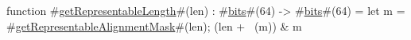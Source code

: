 function #\hyperref[sailMIPSzgetRepresentableLength]{getRepresentableLength}#(len) : #\hyperref[sailMIPSzbits]{bits}#(64) -> #\hyperref[sailMIPSzbits]{bits}#(64) = {
  let m = #\hyperref[sailMIPSzgetRepresentableAlignmentMask]{getRepresentableAlignmentMask}#(len);
  (len + ~(m)) & m
}
